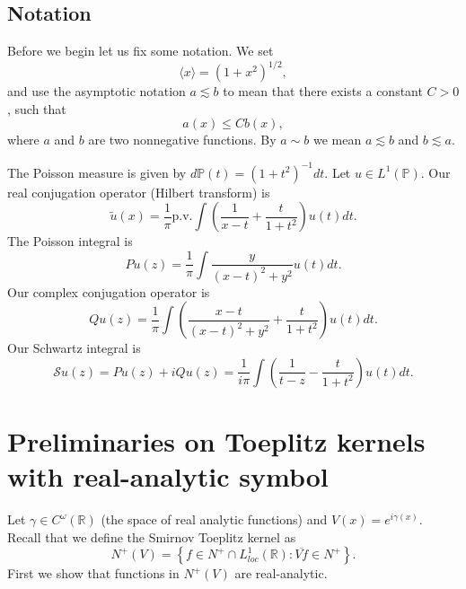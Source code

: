 \documentclass{article}[12pt]
\theoremstyle{remark}
\begin{document}
\subsection{Notation}

Before we begin let us fix some notation. We set
\begin{equation*}
    \langle x \rangle = (1+x^{2})^{1/2},
\end{equation*}
and use the asymptotic notation $a \lesssim b$ to mean that there exists a constant $C > 0$, such that
\begin{equation*}
    a(x) \leq Cb(x),
\end{equation*}
where $a$ and $b$ are two nonnegative functions. By $a \sim b$ we mean $a \lesssim b$ and $b\lesssim a$. \newline

The Poisson measure is given by $d\mathbb{P}(t) = (1+t^{2})^{-1}dt$. Let $u \in L^{1}(\mathbb{P})$. \newline
Our real conjugation operator (Hilbert transform) is
\begin{equation*}
    \tilde{u}(x) = \frac{1}{\pi} \text{p.v.}\int \left(\frac{1}{x-t} + \frac{t}{1+t^{2}}\right)u(t)dt.
\end{equation*}
The Poisson integral is
\begin{equation*}
    Pu(z) = \frac{1}{\pi}\int \frac{y}{(x-t)^{2}+y^{2}}u(t)dt.
\end{equation*}
Our complex conjugation operator is
\begin{equation*}
    Qu(z) = \frac{1}{\pi}\int \left(\frac{x-t}{(x-t)^{2}+y^{2}}+\frac{t}{1+t^{2}}\right)u(t)dt.
\end{equation*}
Our Schwartz integral is
\begin{equation*}
    \mathcal{S}u(z) = Pu(z)+iQu(z) = \frac{1}{i\pi} \int \left( \frac{1}{t-z} - \frac{t}{1+t^{2}}\right)u(t)dt.
\end{equation*}

\section{Preliminaries on Toeplitz kernels with real-analytic symbol}

Let $\gamma \in C^{\omega}(\mathbb{R})$ (the space of real analytic functions) and $V(x) = e^{i\gamma(x)}$. Recall that we define the Smirnov Toeplitz kernel as
\begin{equation*}
    N^{+}(V) = \left\{ f \in N^{+} \cap L^{1}_{loc}(\mathbb{R}) : \overline{Vf} \in N^{+} \right\}.
\end{equation*}
First we show that functions in $N^{+}(V)$ are real-analytic.
\end{document}
